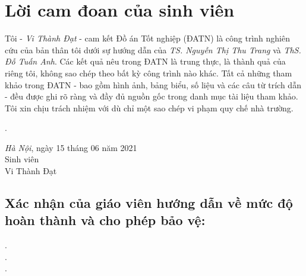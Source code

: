 \documentclass[a4paper, 13pt, oneside]{report}
\begin{document}
\section*{Lời cam đoan của sinh viên}
Tôi - \textit{Vi Thành Đạt} - cam kết Đồ án Tốt nghiệp (ĐATN) là công trình nghiên cứu của bản thân tôi dưới sự hướng dẫn của \textit{TS. Nguyễn Thị Thu Trang} và \textit{ThS. Đỗ Tuấn Anh}. Các kết quả nêu trong ĐATN là trung thực, là thành quả của riêng tôi, không sao chép theo bất kỳ công trình nào khác. Tất cả những tham khảo trong ĐATN - bao gồm hình ảnh, bảng biểu, số liệu và các câu từ trích dẫn  - đều được ghi rõ ràng và đầy đủ nguồn gốc trong danh mục tài liệu tham khảo. Tôi xin chịu trách nhiệm với dù chỉ một sao chép vi phạm quy chế nhà trường.

\begin{minipage}{0.5\textwidth}
    .
\end{minipage}
\begin{minipage}[t]{0.5\textwidth}
    
    \begin{center}
        \textit{Hà Nội}, ngày 15 tháng 06 năm 2021 \\
        Sinh viên\\[3cm]
        
        Vi Thành Đạt
    \end{center}
\end{minipage}
\subsection*{Xác nhận của giáo viên hướng dẫn về mức độ hoàn thành và cho phép bảo vệ:}
.\dotfill \\
.\dotfill \\ 
.\dotfill \\ 

        

        
\end{document}
